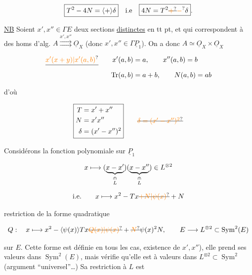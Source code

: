 \[
\boxed{T^2-4N=\inserted{+}\delta}\quad\text{i.e}\quad\boxed{4N=T^2\deleted{\unsure{+}}{\unsure{-}}\delta}.
\]


\uline{NB} Soient $x',x''\in\Gamma E$ deux sections \uline{distinctes} en tt pt, et qui correspondent à des homs d'alg. $A\overset{x',x''}{\rightrightarrows}\underline O_X$ (donc $x',x''\in\Gamma\underline P_1$). On a donc $A\simeq\underline O_X\times\underline O_X$

\[
\begin{aligned}
\deleted{\unsure{x'(x+y)|x'(a,b)}}\qquad x'(a,b)&=a,\qquad x''(a,b)=b\\
\operatorname{Tr}(a,b)&=a+b,\qquad N(a,b)=ab
\end{aligned}
\]

d'où

\[
\boxed{\begin{aligned}T&=x'+x''\\N&=x'x''\\\delta&=(x'-x'')^2\end{aligned}}\qquad\deleted{\unsure{\delta=(x'-x'')^2}}
\]



Considérons la fonction polynomiale sur $\underline P_1$

\[
x\longmapsto (\underbrace{x-x'}_{\substack{\rotatebox{90}{$\scriptstyle\ni$}\\ L}})(\underbrace{x-x''}_{\substack{\rotatebox{90}{$\scriptstyle\ni$}\\ L}})\in L^{\otimes 2}
\]

\[
\text{i.e.}\qquad x\longmapsto x^2-Tx\deleted{\unsure{+N|\psi(x)}}+N
\]

restriction de la forme quadratique

\[
Q:\quad x\longmapsto x^2-\inserted{\psi(x)}Tx\deleted{\unsure{Q(x)|\psi(x)}}+\deleted{\unsure{N}}\psi(x)^2N,\qquad E\longrightarrow L^{\otimes 2}\subset\operatorname{Sym}^2(E)
\]

sur $E$. Cette forme est définie  en tous les cas,  existence de $x',x''$), elle prend ses valeurs dans $\operatorname{Sym}^2(E)$, mais  vérifie qu'elle est à valeurs dans $L^{\otimes 2}\subset\operatorname{Sym}^2$ (argument ``universel''\ldots) Sa restriction à $L$ est

